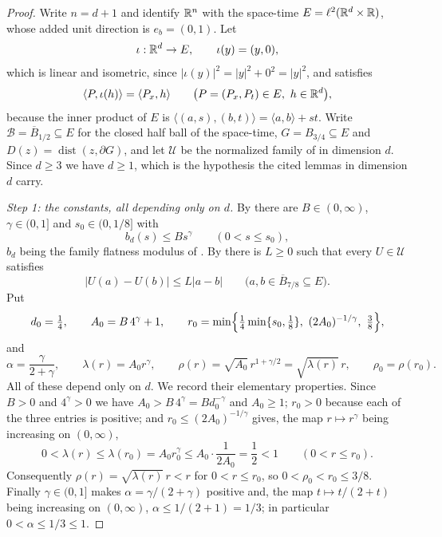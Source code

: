\begin{proof}
Write $n=d+1$ and identify $\mathbb{R}^n$ with the space-time
$E=\ell^2(\mathbb{R}^d\times\mathbb{R})$, whose added unit direction is $e_b=(0,1)$. Let
\[
  \iota:\mathbb{R}^d\to E,\qquad \iota(y)=(y,0),
\]
which is linear and isometric, since $|\iota(y)|^2=|y|^2+0^2=|y|^2$, and
satisfies
\begin{equation}\label{eq:me-slice-inner}
  \langle P,\iota(h)\rangle=\langle P_x,h\rangle
  \qquad\bigl(P=(P_x,P_t)\in E,\ h\in\mathbb{R}^d\bigr),
\end{equation}
because the inner product of $E$ is
$\langle(a,s),(b,t)\rangle=\langle a,b\rangle+st$. Write
$\mathcal B=\overline B_{1/2}\subseteq E$ for the closed half ball of the
space-time, $G=B_{3/4}\subseteq E$ and $D(z)=\operatorname{dist}(z,\partial G)$,
and let $\mathcal U$ be the normalized family of 
in dimension $d$. Since $d\ge3$ we have $d\ge1$, which is the hypothesis the
cited lemmas in dimension $d$ carry.

\emph{Step 1: the constants, all depending only on $d$.}
By  there are $B\in(0,\infty)$, $\gamma\in(0,1]$ and
$s_0\in(0,1/8]$ with
\begin{equation}\label{eq:me-power}
  b_d(s)\le Bs^\gamma\qquad(0<s\le s_0),
\end{equation}
$b_d$ being the family flatness modulus of . By
 there is $L\ge0$ such that every
$U\in\mathcal U$ satisfies
\begin{equation}\label{eq:me-lip}
  |U(a)-U(b)|\le L|a-b|\qquad\bigl(a,b\in\overline B_{7/8}\subseteq E\bigr).
\end{equation}
Put
\[
  d_0=\tfrac14,\qquad A_0=B\,4^\gamma+1,\qquad
  r_0=\min\Bigl\{\tfrac14\min\{s_0,\tfrac18\},\ (2A_0)^{-1/\gamma},\
                  \tfrac38\Bigr\},
\]
and
\[
  \alpha=\frac{\gamma}{2+\gamma},\qquad
  \lambda(r)=A_0r^\gamma,\qquad
  \rho(r)=\sqrt{A_0}\,r^{1+\gamma/2}=\sqrt{\lambda(r)}\,r,\qquad
  \rho_0=\rho(r_0).
\]
All of these depend only on $d$. We record their elementary properties.
Since $B>0$ and $4^\gamma>0$ we have $A_0>B\,4^\gamma=Bd_0^{-\gamma}$ and
$A_0\ge1$; $r_0>0$ because each of the three entries is positive; and
$r_0\le(2A_0)^{-1/\gamma}$ gives, the map $r\mapsto r^\gamma$ being increasing
on $(0,\infty)$,
\begin{equation}\label{eq:me-lambda-small}
  0<\lambda(r)\le\lambda(r_0)=A_0r_0^\gamma\le A_0\cdot\frac1{2A_0}
   =\frac12<1\qquad(0<r\le r_0).
\end{equation}
Consequently $\rho(r)=\sqrt{\lambda(r)}\,r<r$ for $0<r\le r_0$, so
$0<\rho_0<r_0\le3/8$. Finally $\gamma\in(0,1]$ makes
$\alpha=\gamma/(2+\gamma)$ positive and, the map $t\mapsto t/(2+t)$ being
increasing on $(0,\infty)$, $\alpha\le1/(2+1)=1/3$; in particular
$0<\alpha\le1/3\le1$.


\end{proof}
